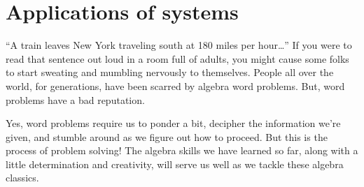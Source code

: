 %
%
%
%
%

\section{Applications of systems}
\label{sec:sysapplications}

``A train leaves New York traveling south at 180 miles per hour\ldots'' If you were to read that sentence out loud in a room full of adults, you might cause some folks to start sweating and mumbling nervously to themselves. People all over the world, for generations, have been scarred by algebra word problems. But, word problems have a bad reputation.

Yes, word problems require us to ponder a bit, decipher the information we're given, and stumble around as we figure out how to proceed. But this is the process of problem solving! The algebra skills we have learned so far, along with a little determination and creativity, will serve us well as we tackle these algebra classics.


